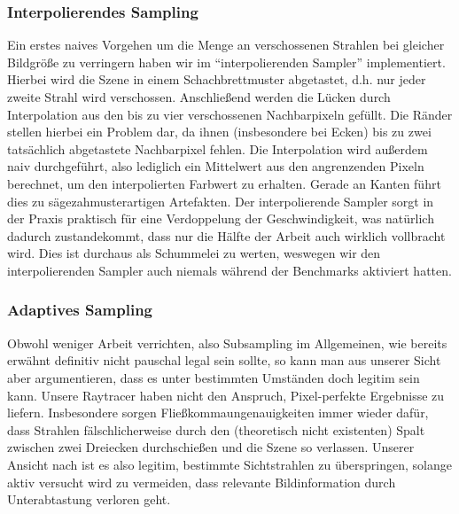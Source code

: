 \subsubsection{Interpolierendes Sampling}
Ein erstes naives Vorgehen um die Menge an verschossenen Strahlen bei gleicher Bildgröße zu verringern haben wir im "`interpolierenden Sampler"' implementiert.
Hierbei wird die Szene in einem Schachbrettmuster abgetastet, d.h. nur jeder zweite Strahl wird verschossen.
Anschließend werden die Lücken durch Interpolation aus den bis zu vier verschossenen Nachbarpixeln gefüllt.
Die Ränder stellen hierbei ein Problem dar, da ihnen (insbesondere bei Ecken) bis zu zwei tatsächlich abgetastete Nachbarpixel fehlen.
Die Interpolation wird außerdem naiv durchgeführt, also lediglich ein Mittelwert aus den angrenzenden Pixeln berechnet, um den interpolierten Farbwert zu erhalten.
Gerade an Kanten führt dies zu sägezahmusterartigen Artefakten.
Der interpolierende Sampler sorgt in der Praxis praktisch für eine Verdoppelung der Geschwindigkeit, was natürlich dadurch zustandekommt, dass nur die Hälfte der Arbeit auch wirklich vollbracht wird.
Dies ist durchaus als Schummelei zu werten, weswegen wir den interpolierenden Sampler auch niemals während der Benchmarks aktiviert hatten.

\subsubsection{Adaptives Sampling}
Obwohl weniger Arbeit verrichten, also Subsampling im Allgemeinen, wie bereits erwähnt definitiv nicht pauschal legal sein sollte, so kann man aus unserer Sicht aber argumentieren, dass es unter bestimmten Umständen doch legitim sein kann.
Unsere Raytracer haben nicht den Anspruch, Pixel-perfekte Ergebnisse zu liefern.
Insbesondere sorgen Fließkommaungenauigkeiten immer wieder dafür, dass Strahlen fälschlicherweise durch den (theoretisch nicht existenten) Spalt zwischen zwei Dreiecken durchschießen und die Szene so verlassen.
Unserer Ansicht nach ist es also legitim, bestimmte Sichtstrahlen zu überspringen, solange aktiv versucht wird zu vermeiden, dass relevante Bildinformation durch Unterabtastung verloren geht.
